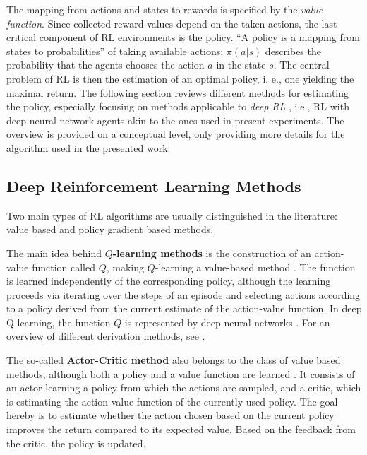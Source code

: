 The mapping from actions and states to rewards is specified by the \textit{value function}. Since collected reward values depend on the taken actions, the last critical component of RL environments is the policy. ``A policy is a mapping from states to probabilities'' of taking available actions: $\pi(a | s)$ describes the probability that the agents chooses the action $a$ in the state $s$. The central problem of RL is then the estimation of an optimal policy, i. e., one yielding the maximal return. The following section reviews different methods for estimating the policy, especially focusing on methods applicable to \textit{deep RL} \parencite{lecun2015deep}, i.e., RL with deep neural network agents akin to the ones used in present experiments. The overview is provided on a conceptual level, only providing more details for the algorithm used in the presented work.

\subsection{Deep Reinforcement Learning Methods}
\label{rl_methods}
Two main types of RL algorithms are usually distinguished in the literature: value based and policy gradient based methods. 

The main idea behind \textbf{$Q$-learning methods} is the construction of an action-value function called $Q$, making $Q$-learning a value-based method \parencite{sutton2018reinforcement}. The function is learned independently of the corresponding policy, although the learning proceeds via iterating over the steps of an episode and selecting actions according to a policy derived from the current estimate of the action-value function. In deep Q-learning, the function $Q$ is represented by deep neural networks \parencite[e.g.,][]{hester2018deep}. For an overview of different derivation methods, see \cite{sutton2018reinforcement}. 

The so-called \textbf{Actor-Critic method} also belongs to the class of value based methods, although both a policy and a value function are learned \parencite{sutton2018reinforcement}. It consists of an actor learning a policy from which the actions are sampled, and a critic, which is estimating the action value function of the currently used policy. The goal hereby is to estimate whether the action chosen based on the current policy improves the return compared to its expected value. Based on the feedback from the critic, the policy is updated. 

